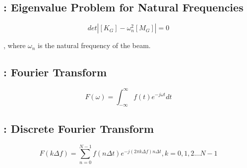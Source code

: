 \documentclass[a4paper, 12pt]{article}
\begin{document}
\subsection{: Eigenvalue Problem for Natural Frequencies}
\begin{equation}
det\left| \left[K_G\right] - \omega_n^2\left[M_G\right]\right| = 0
\end{equation}
\begin{center}
, where $\omega_n$ is the natural frequency of the beam.
\end{center}
\subsection{: Fourier Transform}
\begin{equation}
F\left(\omega\right) = \int_{-\infty}^{\infty} f\left(t\right)e^{-j\omega t} dt
\end{equation}
\subsection{: Discrete Fourier Transform}
\begin{equation}
F\left(k\Delta f\right) = \sum\limits_{n = 0}^{N - 1} f \left( n\Delta t \right)e^{-j\left(2\pi k \Delta f\right)n \Delta t}, k = 0, 1, 2 ... N - 1
\end{equation}
\end{document}
